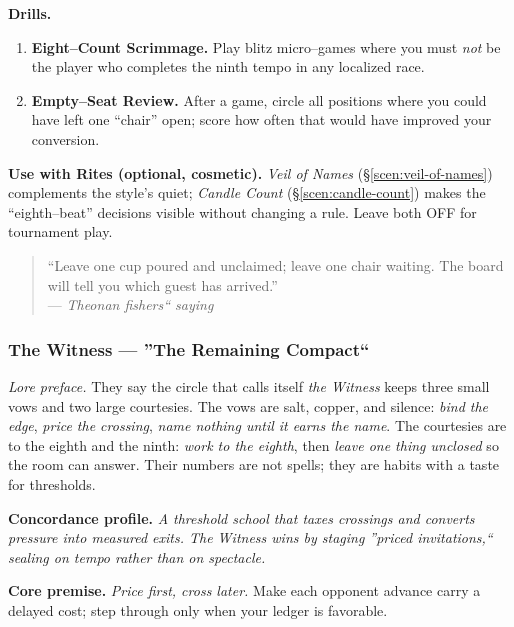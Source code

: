 \documentclass[11pt]{article}
\numberwithin{equation}{section} %
\theoremstyle{plain} %
\theoremstyle{definition} %
\theoremstyle{remark} %
\begin{document}
\medskip
\noindent\textbf{Drills.}
\begin{enumerate}\setlength\itemsep{0.25em}
  \item \textbf{Eight--Count Scrimmage.} Play blitz micro--games where you must \emph{not} be the player who completes the ninth tempo in any localized race.
  \item \textbf{Empty--Seat Review.} After a game, circle all positions where you could have left one ``chair'' open; score how often that would have improved your conversion.
\end{enumerate}

\medskip
\noindent\textbf{Use with Rites (optional, cosmetic).} \emph{Veil of Names} (\S\ref{scen:veil-of-names}) complements the style's quiet; \emph{Candle Count} (\S\ref{scen:candle-count}) makes the ``eighth--beat'' decisions visible without changing a rule. Leave both \textsc{OFF} for tournament play.

\medskip
\begin{quote}\small
``Leave one cup poured and unclaimed; leave one chair waiting. The board will tell you which guest has arrived.''\\
\hfill --- \textit{Theonan fishers`` saying}
\end{quote}

\subsubsection{The Witness --- ''The Remaining Compact``}
\label{school:witness}

\noindent\textit{Lore preface.} They say the circle that calls itself \emph{the Witness} keeps three small vows and two large courtesies. The vows are salt, copper, and silence: \emph{bind the edge}, \emph{price the crossing}, \emph{name nothing until it earns the name}. The courtesies are to the eighth and the ninth: \emph{work to the eighth}, then \emph{leave one thing unclosed} so the room can answer. Their numbers are not spells; they are habits with a taste for thresholds.

\medskip
\noindent\textbf{Concordance profile.} \emph{A threshold school that taxes crossings and converts pressure into measured exits. The Witness wins by staging ''priced invitations,`` sealing on tempo rather than on spectacle.}

\medskip
\noindent\textbf{Core premise.} \textit{Price first, cross later.} Make each opponent advance carry a delayed cost; step through only when your ledger is favorable.
\end{document}
